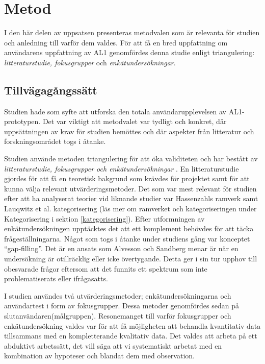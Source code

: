 \section{Metod}
I den här delen av uppsatsen presenteras metodvalen som är relevanta för studien och anledning till varför dem valdes. För att få en bred uppfattning om användarens uppfattning av AL1 genomfördes denna studie enligt triangulering: \textit{litteraturstudie, fokusgrupper} och \textit{enkätundersökningar}. 

\subsection{Tillvägagångssätt}
\label{sec:background}
Studien hade som syfte att utforska den totala användarupplevelsen av AL1-prototypen. Det var viktigt att metodvalet var tydligt och konkret, där uppsättningen av krav för studien bemöttes och där aspekter från litteratur och forskningsområdet togs i åtanke. 
\newline

Studien använde metoden triangulering för att öka validiteten och har bestått av \textit{litteraturstudie, fokusgrupper och enkätundersökningar} \cite{RankinKvalitativaMetoder}. En litteraturstudie gjordes för att få en teoretisk bakgrund som krävdes för projektet samt för att kunna välja relevant utvärderingsmetoder. Det som var mest relevant för studien efter att ha analyserat teorier vid liknande studier var Hassenzahls ramverk \cite{HassenzahlUserQuality} samt Lauqwitz et al. kategorisering\cite{Laugwitz2008ConstructionQuestionnaire} (läs mer om ramverket och kategoriseringen under Kategorisering i sektion \ref{kategorisering}). Efter utformningen av enkätundersökningen upptäcktes det att ett komplement behövdes för att täcka frågeställningarna. Något som togs i åtanke under studiens gång var konceptet \enquote{gap-filling}. Det är en ansats som Alvesson och Sandberg \cite{Alvesson1985GENERATINGPROBLEMATIZATION} menar är när en undersökning är otillräcklig eller icke övertygande. Detta ger i sin tur upphov till obesvarade frågor eftersom att det funnits ett spektrum som inte problematiserats eller ifrågasatts. 
\newline

I studien användes två utvärderingsmetoder; enkätundersökningarna och användartest i form av fokusgrupper. Dessa metoder genomfördes sedan på slutanvändaren(målgruppen). Resonemanget till varför fokusgrupper och enkätundersökning valdes var för att få möjligheten att behandla kvantitativ data tillsammans med en kompletterande kvalitativ data. Det valdes att arbeta på ett abduktivt arbetssätt, det vill säga att vi systematiskt arbetat med en kombination av hypoteser och blandat dem med observation. 

